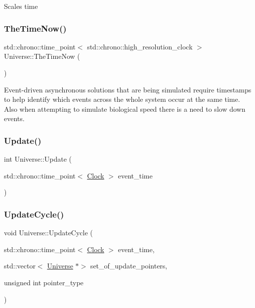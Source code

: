 Scales time\mbox{\label{classUniverse_ae54d34c5d695917e074b8e07e8820bdb}} 
\subsubsection{\texorpdfstring{The\+Time\+Now()}{TheTimeNow()}}
{\footnotesize\ttfamily std\+::chrono\+::time\+\_\+point$<$ std\+::chrono\+::high\+\_\+resolution\+\_\+clock $>$ Universe\+::\+The\+Time\+Now (\begin{DoxyParamCaption}{ }\end{DoxyParamCaption})}

Event-\/driven asynchronous solutions that are being simulated require timestamps to help identify which events across the whole system occur at the same time. Also when attempting to simulate biological speed there is a need to slow down events.\mbox{\label{classUniverse_a64ee5a2c7e86c56fa426acb750438ce9}} 
\subsubsection{\texorpdfstring{Update()}{Update()}}
{\footnotesize\ttfamily int Universe\+::\+Update (\begin{DoxyParamCaption}\item[{std\+::chrono\+::time\+\_\+point$<$ \mbox{\hyperlink{universe_8h_a0ef8d951d1ca5ab3cfaf7ab4c7a6fd80}{Clock}} $>$}]{event\+\_\+time }\end{DoxyParamCaption})}

\mbox{\label{classUniverse_a0d79e614e1af951c06b78cb5768f9c8e}} 
\subsubsection{\texorpdfstring{Update\+Cycle()}{UpdateCycle()}}
{\footnotesize\ttfamily void Universe\+::\+Update\+Cycle (\begin{DoxyParamCaption}\item[{std\+::chrono\+::time\+\_\+point$<$ \mbox{\hyperlink{universe_8h_a0ef8d951d1ca5ab3cfaf7ab4c7a6fd80}{Clock}} $>$}]{event\+\_\+time,  }\item[{std\+::vector$<$ \mbox{\hyperlink{classUniverse}{Universe}} $\ast$$>$}]{set\+\_\+of\+\_\+update\+\_\+pointers,  }\item[{unsigned int}]{pointer\+\_\+type }\end{DoxyParamCaption})}

